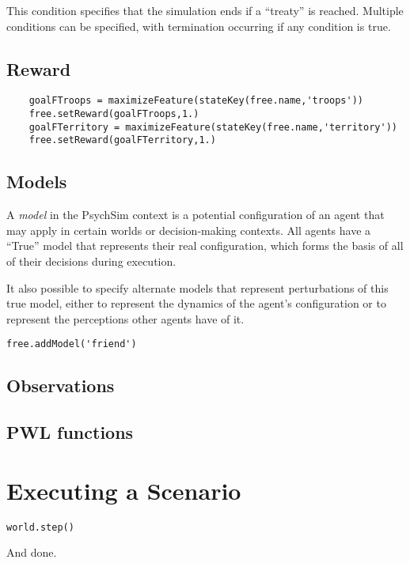\documentclass{book}
\begin{document}
This condition specifies that the simulation ends if a ``treaty'' is reached. Multiple conditions can be specified, with termination occurring if any condition is true.


\section{Reward}

\begin{verbatim}
    goalFTroops = maximizeFeature(stateKey(free.name,'troops'))
    free.setReward(goalFTroops,1.)
    goalFTerritory = maximizeFeature(stateKey(free.name,'territory'))
    free.setReward(goalFTerritory,1.)
\end{verbatim}

\section{Models}

A {\em model} in the PsychSim context is a potential configuration of an agent that may apply in certain worlds or decision-making contexts. All agents have a ``True'' model that represents their real configuration, which forms the basis of all of their decisions during execution. 


It also possible to specify alternate models that represent perturbations of this true model, either to represent the dynamics of the agent's configuration or to represent the perceptions other agents have of it.

\begin{verbatim}
free.addModel('friend')
\end{verbatim}

\section{Observations}

\section{PWL functions}\label{sec:pwl}

\chapter{Executing a Scenario}

\begin{verbatim}
world.step()
\end{verbatim}

And done.
\end{document}
